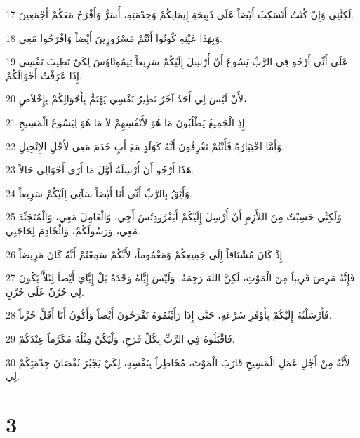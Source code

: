 \par 17 لَكِنَّنِي وَإِنْ كُنْتُ أَنْسَكِبُ أَيْضاً عَلَى ذَبِيحَةِ إِيمَانِكُمْ وَخِدْمَتِهِ، أُسَرُّ وَأَفْرَحُ مَعَكُمْ أَجْمَعِينَ.
\par 18 وَبِهَذَا عَيْنِهِ كُونُوا أَنْتُمْ مَسْرُورِينَ أَيْضاً وَافْرَحُوا مَعِي.
\par 19 عَلَى أَنِّي أَرْجُو فِي الرَّبِّ يَسُوعَ أَنْ أُرْسِلَ إِلَيْكُمْ سَرِيعاً تِيمُوثَاوُسَ لِكَيْ تَطِيبَ نَفْسِي إِذَا عَرَفْتُ أَحْوَالَكُمْ.
\par 20 لأَنْ لَيْسَ لِي أَحَدٌ آخَرُ نَظِيرُ نَفْسِي يَهْتَمُّ بِأَحْوَالِكُمْ بِإِخْلاَصٍ،
\par 21 إِذِ الْجَمِيعُ يَطْلُبُونَ مَا هُوَ لأَنْفُسِهِمْ لاَ مَا هُوَ لِيَسُوعَ الْمَسِيحِ.
\par 22 وَأَمَّا اخْتِبَارُهُ فَأَنْتُمْ تَعْرِفُونَ أَنَّهُ كَوَلَدٍ مَعَ أَبٍ خَدَمَ مَعِي لأَجْلِ الإِنْجِيلِ.
\par 23 هَذَا أَرْجُو أَنْ أُرْسِلَهُ أَوَّلَ مَا أَرَى أَحْوَالِي حَالاً.
\par 24 وَأَثِقُ بِالرَّبِّ أَنِّي أَنَا أَيْضاً سَآتِي إِلَيْكُمْ سَرِيعاً.
\par 25 وَلَكِنِّي حَسِبْتُ مِنَ اللاَّزِمِ أَنْ أُرْسِلَ إِلَيْكُمْ أَبَفْرُودِتُسَ أَخِي، وَالْعَامِلَ مَعِي، وَالْمُتَجَنِّدَ مَعِي، وَرَسُولَكُمْ، وَالْخَادِمَ لِحَاجَتِي.
\par 26 إِذْ كَانَ مُشْتَاقاً إِلَى جَمِيعِكُمْ وَمَغْمُوماً، لأَنَّكُمْ سَمِعْتُمْ أَنَّهُ كَانَ مَرِيضاً.
\par 27 فَإِنَّهُ مَرِضَ قَرِيباً مِنَ الْمَوْتِ، لَكِنَّ اللهَ رَحِمَهُ. وَلَيْسَ إِيَّاهُ وَحْدَهُ بَلْ إِيَّايَ أَيْضاً لِئَلاَّ يَكُونَ لِي حُزْنٌ عَلَى حُزْنٍ.
\par 28 فَأَرْسَلْتُهُ إِلَيْكُمْ بِأَوْفَرِ سُرْعَةٍ، حَتَّى إِذَا رَأَيْتُمُوهُ تَفْرَحُونَ أَيْضاً وَأَكُونُ أَنَا أَقَلَّ حُزْناً.
\par 29 فَاقْبَلُوهُ فِي الرَّبِّ بِكُلِّ فَرَحٍ، وَلْيَكُنْ مِثْلُهُ مُكَرَّماً عِنْدَكُمْ.
\par 30 لأَنَّهُ مِنْ أَجْلِ عَمَلِ الْمَسِيحِ قَارَبَ الْمَوْتَ، مُخَاطِراً بِنَفْسِهِ، لِكَيْ يَجْبُرَ نُقْصَانَ خِدْمَتِكُمْ لِي.

\chapter{3}

